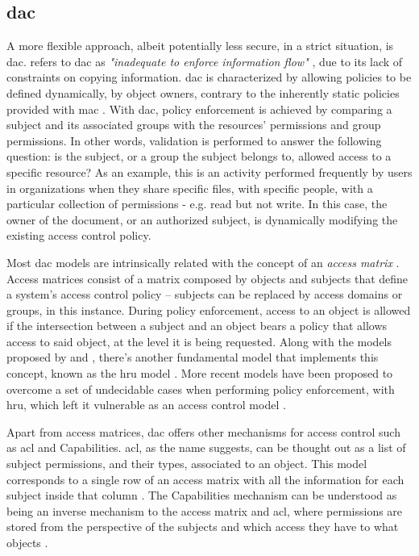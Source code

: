 \subsection{\glsdesc{dac}}
\label{sec:models-dac}

A more flexible approach, albeit potentially less secure, in a strict situation, is \glsdesc{dac}. \citeauthor{sandhu_lattice-based_1993} refers to \gls{dac} as \emph{"inadequate to enforce information flow"} \cite[8]{sandhu_lattice-based_1993}, due to its lack of constraints on copying information. \gls{dac} is characterized by allowing policies to be defined dynamically, by object owners, contrary to the inherently static policies provided with \gls{mac} \cite[23]{biba_integrity_1977}. With \gls{dac}, policy enforcement is achieved by comparing a subject and its associated groups with the resources’ permissions and group permissions. In other words, validation is performed to answer the following question: is the subject, or a group the subject belongs to, allowed access to a specific resource? As an example, this is an activity performed frequently by users in organizations when they share specific files, with specific people, with a particular collection of permissions - e.g. read but not write. In this case, the owner of the document, or an authorized subject, is dynamically modifying the existing access control policy.

Most \gls{dac} models are intrinsically related with the concept of an \emph{access matrix} \cite{graham_protection:_1972, lampson_protection_1974}. Access matrices consist of a matrix composed by objects and subjects that define a system’s access control policy – subjects can
be replaced by access domains or groups, in this instance. During policy
enforcement, access to an object is allowed if the intersection between a subject and an object bears a policy
that allows access to said object, at the level it is being requested. Along with the models proposed by \citeauthor{graham_protection:_1972} \cite{graham_protection:_1972} and \citeauthor{lampson_protection_1974} \cite{lampson_protection_1974}, there's another fundamental model that implements this concept, known as the \gls{hru} model \cite{harrison_protection_1976}. More recent models have been proposed to overcome a set of undecidable cases when performing policy enforcement, with \gls{hru}, which left it vulnerable as an access control model \cite{sandhu_schematic_1988, sandhu_typed_1992}.

Apart from access matrices, \gls{dac} offers other mechanisms for access control such as \gls{acl} and Capabilities. \gls{acl}, as the name suggests, can be thought out as a list of subject permissions, and their types, associated to an object. This model corresponds to a single row of an access matrix with all the information for each subject inside that column \cite{sandhu1994access}. The Capabilities mechanism can be understood as being an inverse mechanism to the access matrix and \gls{acl}, where permissions are stored from the perspective of the subjects and which access they have to what objects \cite{sandhu1994access}.

